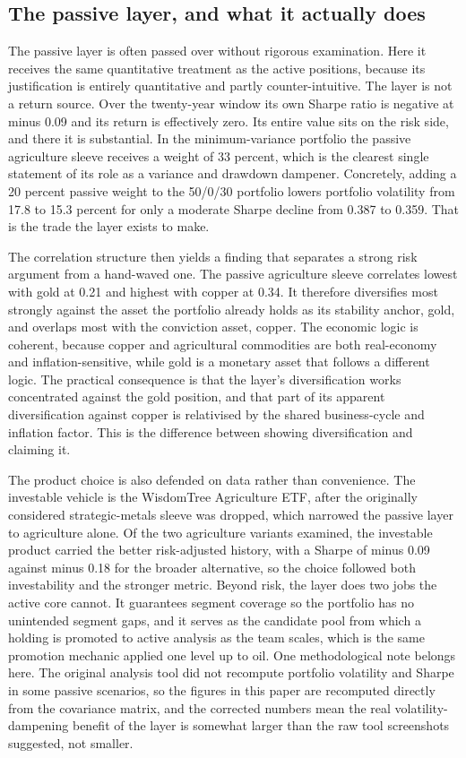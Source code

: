 \documentclass[11pt,a4paper]{article}
\begin{document}
\subsection{The passive layer, and what it actually does}

The passive layer is often passed over without rigorous examination. Here it receives the same quantitative treatment as the active positions, because its justification is entirely quantitative and partly counter-intuitive. The layer is not a return source. Over the twenty-year window its own Sharpe ratio is negative at minus 0.09 and its return is effectively zero. Its entire value sits on the risk side, and there it is substantial. In the minimum-variance portfolio the passive agriculture sleeve receives a weight of 33 percent, which is the clearest single statement of its role as a variance and drawdown dampener. Concretely, adding a 20 percent passive weight to the 50/0/30 portfolio lowers portfolio volatility from 17.8 to 15.3 percent for only a moderate Sharpe decline from 0.387 to 0.359. That is the trade the layer exists to make.

The correlation structure then yields a finding that separates a strong risk argument from a hand-waved one. The passive agriculture sleeve correlates lowest with gold at 0.21 and highest with copper at 0.34. It therefore diversifies most strongly against the asset the portfolio already holds as its stability anchor, gold, and overlaps most with the conviction asset, copper. The economic logic is coherent, because copper and agricultural commodities are both real-economy and inflation-sensitive, while gold is a monetary asset that follows a different logic. The practical consequence is that the layer's diversification works concentrated against the gold position, and that part of its apparent diversification against copper is relativised by the shared business-cycle and inflation factor. This is the difference between showing diversification and claiming it.

The product choice is also defended on data rather than convenience. The investable vehicle is the WisdomTree Agriculture ETF, after the originally considered strategic-metals sleeve was dropped, which narrowed the passive layer to agriculture alone. Of the two agriculture variants examined, the investable product carried the better risk-adjusted history, with a Sharpe of minus 0.09 against minus 0.18 for the broader alternative, so the choice followed both investability and the stronger metric. Beyond risk, the layer does two jobs the active core cannot. It guarantees segment coverage so the portfolio has no unintended segment gaps, and it serves as the candidate pool from which a holding is promoted to active analysis as the team scales, which is the same promotion mechanic applied one level up to oil. One methodological note belongs here. The original analysis tool did not recompute portfolio volatility and Sharpe in some passive scenarios, so the figures in this paper are recomputed directly from the covariance matrix, and the corrected numbers mean the real volatility-dampening benefit of the layer is somewhat larger than the raw tool screenshots suggested, not smaller.
\end{document}
